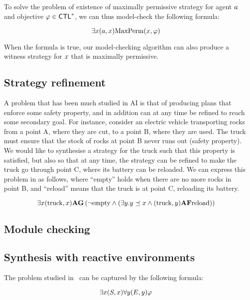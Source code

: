 To solve the problem of existence of maximally permissive strategy for
agent $a$ and objective $\varphi\in\textnormal{{\sffamily CTL}}^{*}$,  we can thus model-check the
following \SLref formula:

\[\exists x (a,x) \text{MaxPerm}(x,\varphi)\]

When the formula is true, our model-checking algorithm can also
produce a witness strategy for $x$ that is maximally permissive.


\subsection{Strategy refinement}
\label{sec-plan-B}

A problem that has been much studied in AI  is
that of producing plans that enforce some safety property, and in addition
can at any time be refined to reach some secondary goal. For instance,
consider an electric vehicle transporting rocks from a point A, where
they are cut, to a point B, where they are used. The truck must ensure
that the stock of rocks at point B never runs out (safety property). We would like to synthesise a
strategy for the truck such that  this property is satisfied, but also
so that at any time, the strategy can be refined to make the truck go
through point C, where its battery can be reloaded.
We can express  this problem in \SLref as follows, where ``empty''
holds when there are no more rocks in point B, and ``reload'' means
that the truck is at point C, reloading its battery.

\[\exists x (\text{truck},x) {\bf A} {\bf G} \left ( \neg \text{empty} \wedge
  (\exists y. y\preceq x \wedge (\text{truck},y){\bf A}{\bf F} \text{reload}) \right )\]


\subsection{Module checking}
\label{section:module}



\subsection{Synthesis with reactive environments}
\label{sec-synth-open-env}

The problem studied in~\cite{kupferman2000open} can be captured by the
following formula:

\[\exists x (S,x) \forall y (E,y) \varphi\]


